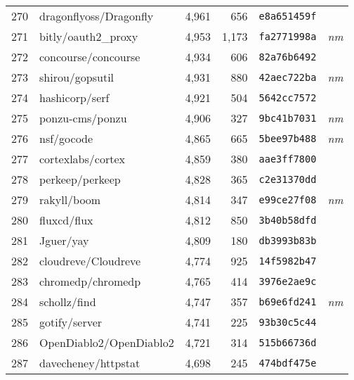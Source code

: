 {\begin{supertabular}{llrrll}
        270 &             dragonflyoss/Dragonfly &  4,961 &    656 &  \texttt{e8a651459f} &              \\
        271 &                bitly/oauth2\_proxy &  4,953 &  1,173 &  \texttt{fa2771998a} &  \textit{nm} \\
        272 &                concourse/concourse &  4,934 &    606 &  \texttt{82a76b6492} &              \\
        273 &                    shirou/gopsutil &  4,931 &    880 &  \texttt{42aec722ba} &  \textit{nm} \\
        274 &                     hashicorp/serf &  4,921 &    504 &  \texttt{5642cc7572} &              \\
        275 &                    ponzu-cms/ponzu &  4,906 &    327 &  \texttt{9bc41b7031} &  \textit{nm} \\
        276 &                         nsf/gocode &  4,865 &    665 &  \texttt{5bee97b488} &  \textit{nm} \\
        277 &                  cortexlabs/cortex &  4,859 &    380 &  \texttt{aae3ff7800} &              \\
        278 &                    perkeep/perkeep &  4,828 &    365 &  \texttt{c2e31370dd} &              \\
        279 &                        rakyll/boom &  4,814 &    347 &  \texttt{e99ce27f08} &  \textit{nm} \\
        280 &                        fluxcd/flux &  4,812 &    850 &  \texttt{3b40b58dfd} &              \\
        281 &                          Jguer/yay &  4,809 &    180 &  \texttt{db3993b83b} &              \\
        282 &                cloudreve/Cloudreve &  4,774 &    925 &  \texttt{14f5982b47} &              \\
        283 &                  chromedp/chromedp &  4,765 &    414 &  \texttt{3976e2ae9c} &              \\
        284 &                       schollz/find &  4,747 &    357 &  \texttt{b69e6fd241} &  \textit{nm} \\
        285 &                      gotify/server &  4,741 &    225 &  \texttt{93b30c5c44} &              \\
        286 &            OpenDiablo2/OpenDiablo2 &  4,721 &    314 &  \texttt{515b66736d} &              \\
        287 &                davecheney/httpstat &  4,698 &    245 &  \texttt{474bdf475e} &              \\

\end{supertabular}}
